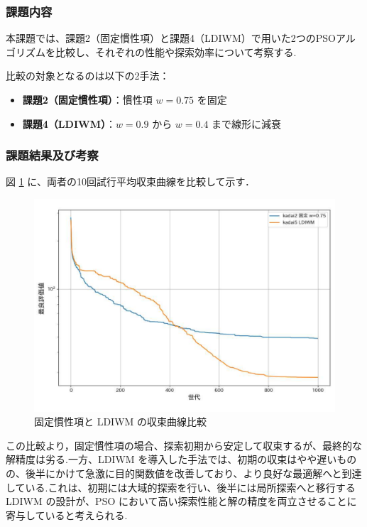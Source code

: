\subsubsection{課題内容}

本課題では、課題2（固定慣性項）と課題4（LDIWM）で用いた2つのPSOアルゴリズムを比較し、それぞれの性能や探索効率について考察する.

比較の対象となるのは以下の2手法：

\begin{itemize}
  \item \textbf{課題2（固定慣性項）}：慣性項 \( w = 0.75 \) を固定
  \item \textbf{課題4（LDIWM）}：\( w = 0.9 \) から \( w = 0.4 \) まで線形に減衰
\end{itemize}

\subsubsection{課題結果及び考察}

図 \ref{fig:kadai2_vs_kadai5} に、両者の10回試行平均収束曲線を比較して示す．

\begin{figure}[H]
  \centering
  \includegraphics[width=0.8\linewidth]{figure/kadai2_vs_kadai5.pdf}
  \caption{固定慣性項と LDIWM の収束曲線比較}
  \label{fig:kadai2_vs_kadai5}
\end{figure}

この比較より，固定慣性項の場合、探索初期から安定して収束するが、最終的な解精度は劣る.一方、LDIWM を導入した手法では、初期の収束はやや遅いものの、後半にかけて急激に目的関数値を改善しており、より良好な最適解へと到達している.これは、初期には大域的探索を行い、後半には局所探索へと移行する LDIWM の設計が、PSO において高い探索性能と解の精度を両立させることに寄与していると考えられる.

